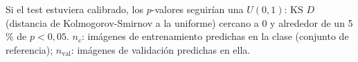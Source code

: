\begin{table}
\smallskip
\parbox{\linewidth}{\scriptsize Si el test estuviera calibrado, los $p$-valores seguirían una $U(0,1)$: KS $D$ (distancia de Kolmogorov-Smirnov a la uniforme) cercano a 0 y alrededor de un 5\,\% de $p<0{,}05$. $n_c$: imágenes de entrenamiento predichas en la clase (conjunto de referencia); $n_{\mathrm{val}}$: imágenes de validación predichas en ella.}
\end{table}
